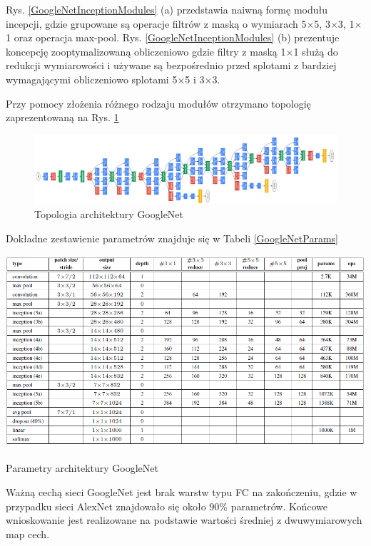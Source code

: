 Rys. \ref{GoogleNetInceptionModules} (a) przedstawia naiwną formę modułu incepcji, gdzie grupowane są operacje filtrów z maską o wymiarach 5$\times$5, 3$\times$3, 1$\times$1 oraz operacja max-pool. Rys. \ref{GoogleNetInceptionModules} (b) prezentuje koncepcję zooptymalizowaną obliczeniowo gdzie filtry z maską 1$\times$1 służą do redukcji wymiarowości i używane są bezpośrednio przed splotami z bardziej wymagającymi obliczeniowo splotami 5$\times$5 i 3$\times$3. 

Przy pomocy złożenia różnego rodzaju modułów otrzymano topologię zaprezentowaną na Rys. \ref{GoogleNetTopo}
\begin{figure}[h!]
	\centering
	\includegraphics[width=1\textwidth]{figures/GoogleNet.png}
	\caption{Topologia architektury GoogleNet}
	\label{GoogleNetTopo}
\end{figure}

Dokładne zestawienie parametrów znajduje się w Tabeli \ref{GoogleNetParams}

\begin{table}[h!]
	\centering
	\includegraphics[width=1\textwidth]{figures/GoogleNetparams.png}
	\caption{Parametry architektury GoogleNet}
	\label{GoogleNetParams}
\end{table}

Ważną cechą sieci GoogleNet jest brak warstw typu FC na zakończeniu, gdzie w przypadku sieci AlexNet znajdowało się około 90\% parametrów. Końcowe wnioskowanie jest realizowane na podstawie wartości średniej z dwuwymiarowych map cech.

